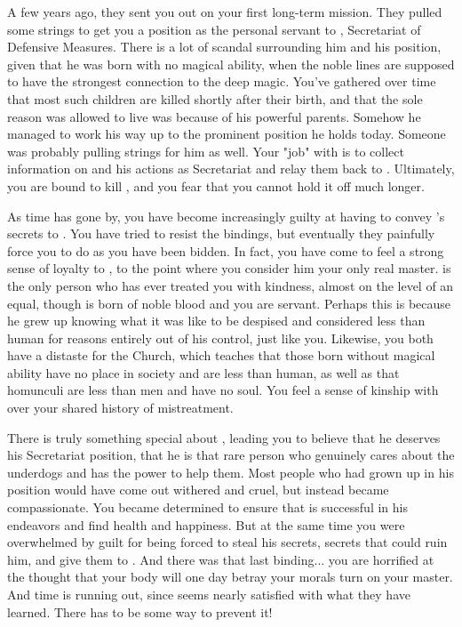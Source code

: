 \documentclass[char]{guildcamp3}
\begin{document}
	A few years ago, they sent you out on your first long-term mission. They pulled some strings to get you a position as the personal servant to \cNobleOne{}, Secretariat of Defensive Measures. There is a lot of scandal surrounding him and his position, given that he was born with no magical ability, when the noble lines are supposed to have the strongest connection to the deep magic. You've gathered over time that most such children are killed shortly after their birth, and that the sole reason \cNobleOne{} was allowed to live was because of his powerful parents. Somehow he managed to work his way up to the prominent position he holds today. Someone was probably pulling strings for him as well. Your "job" with \cNobleOne{\them} is to collect information on \cNobleOne{\them} and his actions as Secretariat and relay them back to \bMagicMob{}. Ultimately, you are bound to kill \cNobleOne{}, and you fear that you cannot hold it off much longer.
	
	As time has gone by, you have become increasingly guilty at having to convey \cNobleOne{}'s secrets to \bMagicMob{}. You have tried to resist the bindings, but eventually they painfully force you to do as you have been bidden. In fact, you have come to feel a strong sense of loyalty to \cNobleOne{}, to the point where you consider him your only real master. \cNobleOne{\they} is the only person who has ever treated you with kindness, almost on the level of an equal, though \cNobleOne{\they} is born of noble blood and you are \cNobleOne{\their} servant. Perhaps this is because he grew up knowing what it was like to be despised and considered less than human for reasons entirely out of his control, just like you. Likewise, you both have a distaste for the Church, which teaches that those born without magical ability have no place in society and are less than human, as well as that homunculi are less than men and have no soul. You feel a sense of kinship with \cNobleOne{} over your shared history of mistreatment.
	
	There is truly something special about \cNobleOne{}, leading you to believe that he deserves his Secretariat position, that he is that rare person who genuinely cares about the underdogs and has the power to help them. Most people who had grown up in his position would have come out withered and cruel, but instead \cNobleOne{} became compassionate. You became determined to ensure that \cNobleOne{\they} is successful in his endeavors and find health and happiness. But at the same time you were overwhelmed by guilt for being forced to steal his secrets, secrets that could ruin him, and give them to \bMagicMob{}. And there was that last binding... you are horrified at the thought that your body will one day betray your morals turn on your master. And time is running out, since \bMagicMob{} seems nearly satisfied with what they have learned. There has to be some way to prevent it! 
	
\end{document}
